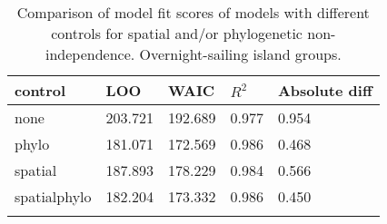 \begin{longtable}{p{2cm}p{2cm}p{2cm}p{2cm}p{2cm}}
  \toprule
control & LOO & WAIC & $R^2$ & Absolute diff \\ 
  \midrule
none & 203.721 & 192.689 & 0.977 & 0.954 \\ 
  phylo & 181.071 & 172.569 & 0.986 & 0.468 \\ 
  spatial & 187.893 & 178.229 & 0.984 & 0.566 \\ 
  spatialphylo & 182.204 & 173.332 & 0.986 & 0.450 \\ 
   \bottomrule
\caption{Comparison of model fit scores of models with different controls for spatial and/or phylogenetic non-independence. Overnight-sailing island groups.} 
\label{model_fit_score_table_SBZR}
\end{longtable}
